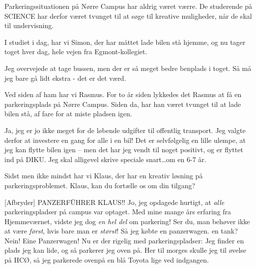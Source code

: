 \documentclass[a4paper,11pt]{article}
\begin{document}
\begin{sketch}



 Parkeringssituationen på Nørre Campus har aldrig
         været værre. De studerende på SCIENCE har derfor været tvunget til at søge
         til kreative muligheder, når de skal til undervisning.

         I studiet i dag, har vi Simon, der har måttet lade bilen stå hjemme, og nu
         tager toget hver dag, hele vejen fra Egmont-kollegiet.

 Jeg overvejede at tage bussen, men der er så meget bedre benplads i toget.
         Så må jeg bare gå lidt ekstra - det er det værd.

 Ved siden af ham har vi Rasmus. For to år siden lykkedes det Rasmus at få en
         parkeringsplads på Nørre Campus. Siden da, har han været tvunget til at lade
         bilen stå, af fare for at miste pladsen igen.

 Ja, jeg er jo ikke meget for de løbende udgifter til offentlig transport. Jeg
         valgte derfor at investere en gang for alle i en bil!
         Det er selvfølgelig en lille ulempe, at jeg kan flytte bilen igen -- men det
         har jeg vendt til noget positivt, og er flyttet ind på DIKU. Jeg skal alligevel
         skrive speciale snart\ldots om en 6-7 år.

 Sidst men ikke mindst har vi Klaus, der har en kreativ løsning på parkeringsproblemet.
         Klaus, kan du fortælle os om din tilgang?

[Afbryder] PANZERFÜHRER KLAUS!! Jo, jeg opdagede hurtigt, at \emph{alle} parkeringspladser på campus var optaget. Med mine
         mange års erfaring fra Hjemmeværnet, vidste jeg dog \emph{en hel del} om parkering! Ser du,
         man behøver ikke at være \emph{først}, hvis bare man er \emph{størst}!
          Så jeg købte en panzerwagen.
 en tank?
 Nein! Eine Panzerwagen! Nu er der rigelig med parkeringspladser:
         Jeg finder en plads jeg kan lide, og så parkerer jeg oven på.
         Her til morges skulle jeg til øvelse på HCØ, så jeg parkerede ovenpå en blå Toyota
         lige ved indgangen.


\end{sketch}
\end{document}
